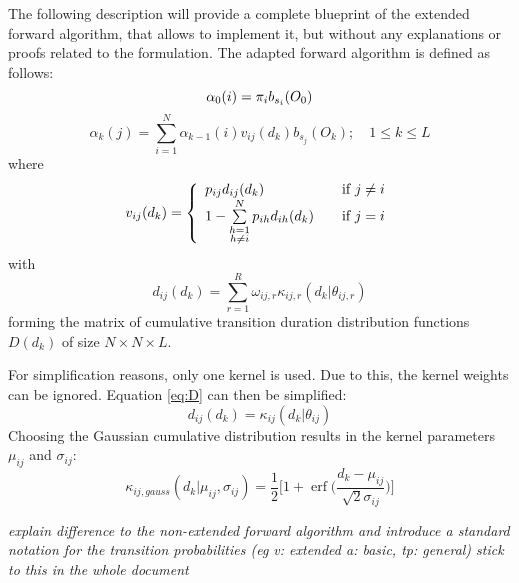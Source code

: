 \documentclass[mscthesis]{usiinfthesis}
\DeclareMathOperator{\erf}{erf}
\begin{document}
The following description will provide a complete blueprint of the extended
forward algorithm, that allows to implement it, but without any explanations or
proofs related to the formulation. The adapted forward algorithm is defined as
follows:
\begin{equation}
    \label{eq:forward_init}
    \alpha_0(i) = \pi_{i}b_{s_i}(O_0) \\
\end{equation}
\begin{equation}
    \label{eq:forward}
    \alpha_k(j) = \sum_{i=1}^{N} \alpha_{k-1}(i) v_{ij}(d_k) b_{s_j}(O_k);
    \quad 1 \leq k \leq L
\end{equation}
where
\begin{equation}
    \label{eq:V}
    v_{ij}(d_k) = \left\{
        \begin{array}{l l}
            p_{ij} d_{ij}(d_k)
                & \quad \text{if $j \neq i$}\\
            1 - \sum\limits_{\substack{h=1 \\ h \neq i}}^{N} p_{ih} d_{ih}(d_k)
                & \quad \text{if $j = i$}
        \end{array} \right.
\end{equation}
with
\begin{equation}
    \label{eq:D}
    d_{ij}(d_k) = \sum_{r=1}^{R} \omega_{ij,r}\kappa_{ij,r}(d_k|\theta_{ij, r})
\end{equation}
forming the matrix of cumulative transition duration distribution functions
$ D(d_k) $ of size $ N \times N \times L $.

For simplification reasons, only one kernel is used. Due to this, the kernel
weights can be ignored. Equation \ref{eq:D} can then be simplified:
\begin{equation}
    \label{eq:D_fact}
    d_{ij}(d_k) = \kappa_{ij}(d_k | \theta_{ij})
\end{equation}
Choosing the Gaussian cumulative distribution results in the kernel parameters
$ \mu_{ij} $ and $ \sigma_{ij} $:
\begin{equation}
    \label{eq:kernel}
    \kappa_{ij, gauss}(d_k | \mu_{ij}, \sigma_{ij}) = 
    \frac{1}{2}\bigg [1 + \erf \big (\frac{d_k - \mu_{ij}}{\sqrt 2 \sigma_{ij}}\big )
        \bigg ]
\end{equation}

\emph{\color{red}explain difference to the non-extended forward algorithm and
    introduce a standard notation for the transition probabilities (eg v: extended
a: basic, tp: general) stick to this in the whole document}
\end{document}
